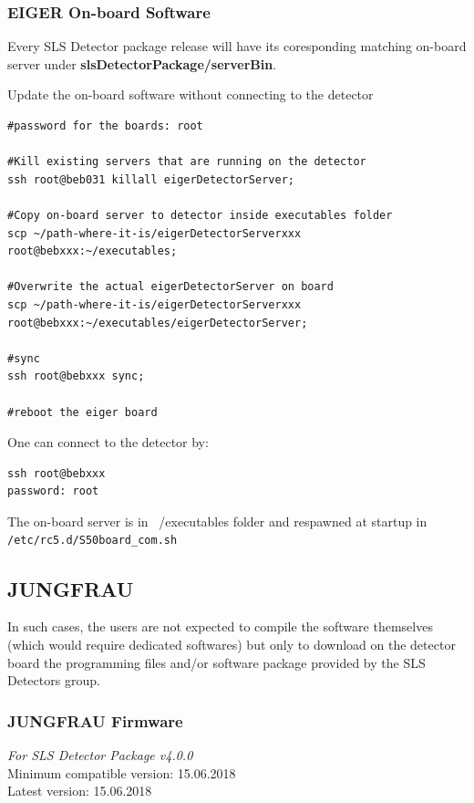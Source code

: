 \documentclass{article}
\begin{document}
\subsubsection{EIGER On-board Software}
Every SLS Detector package release will have its coresponding matching on-board
server under \textbf{slsDetectorPackage/serverBin}.


Update the on-board software without connecting to the detector
\begin{verbatim}
#password for the boards: root

#Kill existing servers that are running on the detector
ssh root@beb031 killall eigerDetectorServer;

#Copy on-board server to detector inside executables folder
scp ~/path-where-it-is/eigerDetectorServerxxx root@bebxxx:~/executables;

#Overwrite the actual eigerDetectorServer on board
scp ~/path-where-it-is/eigerDetectorServerxxx
root@bebxxx:~/executables/eigerDetectorServer;

#sync
ssh root@bebxxx sync; 

#reboot the eiger board
\end{verbatim}


\bigskip One can connect to the detector by:
\begin{verbatim}
ssh root@bebxxx
password: root
\end{verbatim}


The on-board server is in ~/executables folder and respawned at startup in \\
\verb=/etc/rc5.d/S50board_com.sh= 





\subsection{JUNGFRAU}

In such cases, the users are not expected to compile the software
themselves (which would require dedicated softwares) but only to download on the
detector board the programming files and/or software package provided by
the SLS Detectors group.

\subsubsection{JUNGFRAU Firmware}
\textit{For SLS Detector Package v4.0.0} \\
\indent Minimum compatible version: 15.06.2018 \\
\indent Latest version: 15.06.2018 \\
\end{document}
